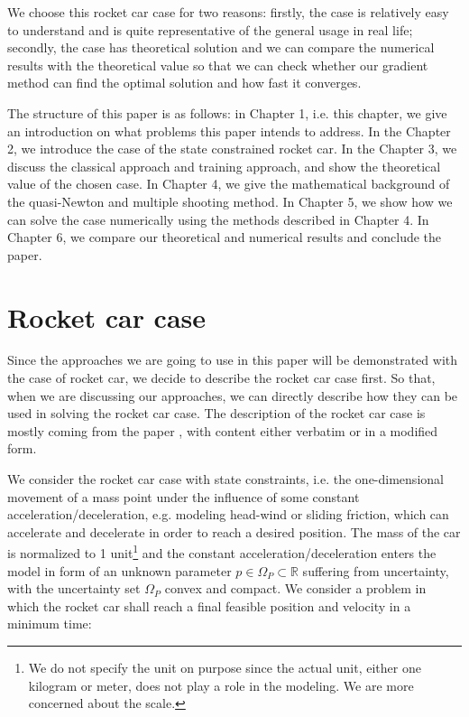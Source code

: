 \documentclass  [
  paper    = a4,
  BCOR     = 10mm,
  twoside,
  fontsize = 12pt,
  fleqn,
  toc      = bibnumbered,
  toc      = listofnumbered,
  numbers  = noendperiod,
  headings = normal,
  listof   = leveldown,
  version  = 3.03
]                                       {scrreprt}
\newcommand{\<}{\langle}
\renewcommand{\>}{\rangle}
\begin{document}
   We choose this rocket car case for two reasons: firstly, the case is relatively easy to understand and is quite representative of the general usage in real life; secondly, the case has theoretical solution and we can compare the numerical results with the theoretical value so that we can check whether our gradient method can find the optimal solution and how fast it converges. 
   
   The structure of this paper is as follows: in Chapter 1, i.e. this chapter,  we give an introduction on what problems this paper intends to address. In the Chapter 2, we introduce the case of the state constrained rocket car. In the Chapter 3, we discuss the classical approach and training approach, and show the theoretical value of the chosen case. In Chapter 4, we give the mathematical background of the quasi-Newton and multiple shooting method. In Chapter 5, we show how we can solve the case numerically using the methods described in Chapter 4. In Chapter 6, we compare our theoretical and numerical results and conclude the paper. 
   
   \label{Chapter1}
   
   
   
   
   \chapter{Rocket car case}
   Since the approaches we are going to use in this paper will be demonstrated with the case of rocket car, we decide to describe the rocket car case first. So that, when we are discussing our approaches, we can directly describe how they can be used in solving the rocket car case. The description of the rocket car case is mostly coming from the paper \cite{MatSch22}, with content either verbatim or in a modified form. 
   
   We consider the rocket car case with state constraints, i.e. the one-dimensional movement of a mass point under the influence of some constant acceleration/deceleration, e.g. modeling head-wind or sliding friction, which can accelerate and decelerate in order to reach a desired position. The mass of the car is normalized to 1 unit\footnote{We do not specify the unit on purpose since the actual unit, either one kilogram or meter, does not play a role in the modeling. We are more concerned about the scale.} and the constant acceleration/deceleration enters the model in form of an unknown parameter $p \in \Omega_P \subset \mathbb{R}$ suffering from uncertainty, with the uncertainty set $\Omega_P$ convex and compact. We consider a problem in which the rocket car shall reach a final feasible position and velocity in a minimum time: 
   
\end{document}
